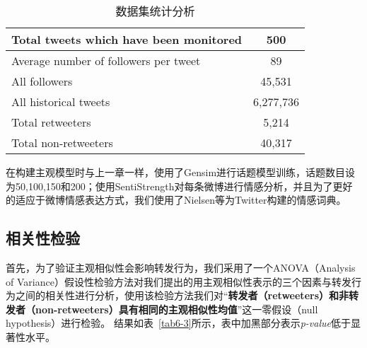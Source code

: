 \begin{table}[htb]
\centering
\caption{数据集统计分析}
\label{tab6-2}
\begin{tabular}{|l|c|}
\hline
Total tweets which have been monitored & 500 \\
\hline
Average number of followers per tweet & 89 \\
\hline
All followers & 45,531 \\
\hline
All historical tweets & 6,277,736 \\
\hline
Total retweeters & 5,214 \\
\hline
Total non-retweeters & 40,317  \\
\hline
\end{tabular}
\end{table}

在构建主观模型时与上一章一样，使用了Gensim进行话题模型训练，话题数目设为50,100,150和200；使用SentiStrength对每条微博进行情感分析，并且为了更好的适应于微博情感表达方式，我们使用了Nielsen等为Twitter构建的情感词典。

\subsection{相关性检验}
首先，为了验证主观相似性会影响转发行为，我们采用了一个ANOVA（Analysis of Variance）假设性检验方法对我们提出的用主观相似性表示的三个因素与转发行为之间的相关性进行分析，使用该检验方法我们对“\textbf{转发者（retweeters）和非转发者（non-retweeters）具有相同的主观相似性均值}”这一零假设（null hypothesis）进行检验。
结果如表~\ref{tab6-3}所示，表中加黑部分表示\textit{p-value}低于显著性水平。

